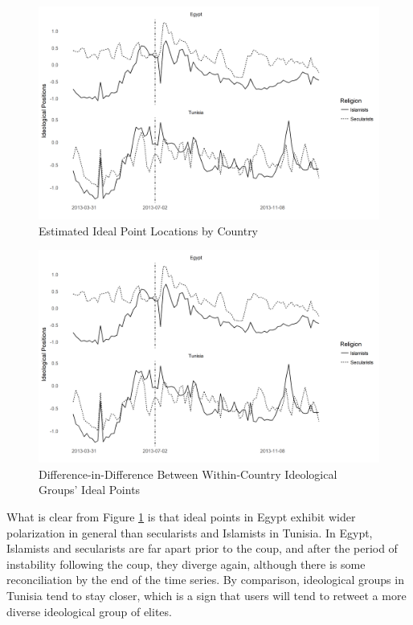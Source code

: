 \documentclass[12pt]{article}
\begin{document}
 \begin{figure}[!h]
 	\centering
	\caption{Estimated Ideal Point Locations by Country}\label{country_facet}
	\centering
	\includegraphics[width=.9\linewidth]{country_coint}
\end{figure}
 \begin{figure}[!h]
	\centering
	\caption{Difference-in-Difference Between Within-Country Ideological Groups' Ideal Points}\label{diffindiff}
	\centering
	\includegraphics[width=.9\linewidth]{country_coint}
\end{figure}

What is clear from Figure \ref{country_facet} is that ideal points in Egypt exhibit wider polarization in general than secularists and Islamists in Tunisia. In Egypt, Islamists and secularists are far apart prior to the coup, and after the period of instability following the coup, they diverge again, although there is some reconciliation by the end of the time series. By comparison, ideological groups in Tunisia tend to stay closer, which is a sign that users will tend to retweet a more diverse ideological group of elites. 
\end{document}
